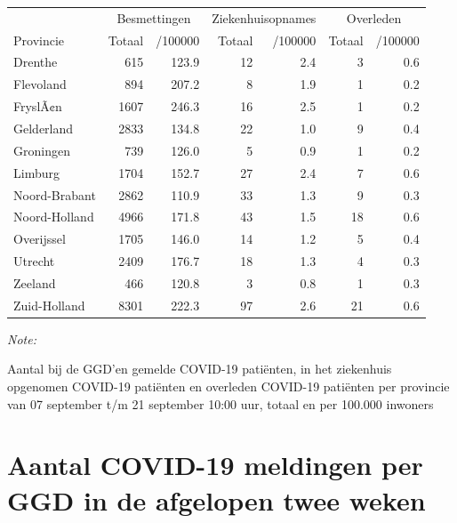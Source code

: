 \documentclass[
  english,
  man,floatsintext]{apa6}
\begin{document}
\begin{table}
\centering
\begin{threeparttable}
\begin{tabular}{lrrrrrr}
\toprule
\multicolumn{1}{c}{ } & \multicolumn{2}{c}{Besmettingen} & \multicolumn{2}{c}{Ziekenhuisopnames} & \multicolumn{2}{c}{Overleden} \\
\cmidrule(l{3pt}r{3pt}){2-3} \cmidrule(l{3pt}r{3pt}){4-5} \cmidrule(l{3pt}r{3pt}){6-7}
Provincie & Totaal & /100000 & Totaal & /100000 & Totaal & /100000\\
\midrule
Drenthe & 615 & 123.9 & 12 & 2.4 & 3 & 0.6\\
Flevoland & 894 & 207.2 & 8 & 1.9 & 1 & 0.2\\
FryslÃ¢n & 1607 & 246.3 & 16 & 2.5 & 1 & 0.2\\
Gelderland & 2833 & 134.8 & 22 & 1.0 & 9 & 0.4\\
Groningen & 739 & 126.0 & 5 & 0.9 & 1 & 0.2\\
Limburg & 1704 & 152.7 & 27 & 2.4 & 7 & 0.6\\
Noord-Brabant & 2862 & 110.9 & 33 & 1.3 & 9 & 0.3\\
Noord-Holland & 4966 & 171.8 & 43 & 1.5 & 18 & 0.6\\
Overijssel & 1705 & 146.0 & 14 & 1.2 & 5 & 0.4\\
Utrecht & 2409 & 176.7 & 18 & 1.3 & 4 & 0.3\\
Zeeland & 466 & 120.8 & 3 & 0.8 & 1 & 0.3\\
Zuid-Holland & 8301 & 222.3 & 97 & 2.6 & 21 & 0.6\\
\bottomrule
\end{tabular}
\begin{tablenotes}
\item \textit{Note: } 
\item Aantal bij de GGD’en gemelde COVID-19 patiënten, in het ziekenhuis opgenomen COVID-19 patiënten en overleden COVID-19 patiënten per provincie van 07 september t/m 21 september 10:00 uur, totaal en per 100.000 inwoners
\end{tablenotes}
\end{threeparttable}
\end{table}

\newpage

\hypertarget{aantal-covid-19-meldingen-per-ggd-in-de-afgelopen-twee-weken}{%
\section{Aantal COVID-19 meldingen per GGD in de afgelopen twee weken}\label{aantal-covid-19-meldingen-per-ggd-in-de-afgelopen-twee-weken}}
\end{document}
